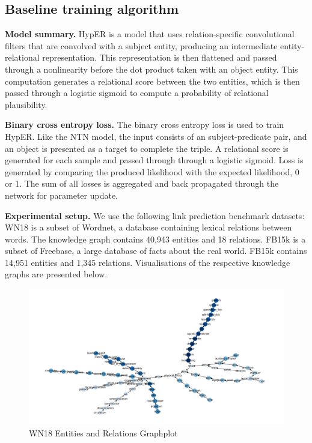\subsection{Baseline training algorithm}
\textbf{Model summary.} HypER is a model that uses relation-specific convolutional filters that are convolved with a subject entity, producing an intermediate entity-relational representation. This representation is then flattened and passed through a nonlinearity before the dot product taken with an object entity. This computation generates a relational score between the two entities, which is then passed through a logistic sigmoid to compute a probability of relational plausibility. \par

\noindent \textbf{Binary cross entropy loss.} The binary cross entropy loss is used to train HypER. Like the NTN model, the input consists of an subject-predicate pair, and an object is presented as a target to complete the triple. A relational score is generated for each sample and passed through through a logistic sigmoid. Loss is generated by comparing the produced likelihood with the expected likelihood, 0 or 1. The sum of all losses is aggregated and back propagated through the network for parameter update. \par

\noindent \textbf{Experimental setup.} We use the following link prediction benchmark datasets: WN18 \citep{bordes2013translating} is a subset of Wordnet, a database containing lexical relations between words. The knowledge graph contains 40,943 entities and 18 relations. FB15k \citep{bordes2013translating} is a subset of Freebase, a large database of facts about the real world. FB15k contains 14,951 entities and 1,345 relations. Visualisations of the respective knowledge graphs are presented below.

\bigskip

\begin{figure}[H]
   	\centering
    	\includegraphics[width=\textwidth]{WN18_Graph}
	\caption{WN18 Entities and Relations Graphplot}
\end{figure}

